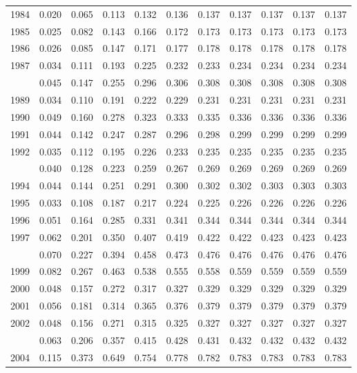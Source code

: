 \documentclass[
]{article}
\begin{document}
\begin{longtable}[t]{lrrrrrrrrrr}
1984 & 0.020 & 0.065 & 0.113 & 0.132 & 0.136 & 0.137 & 0.137 & 0.137 & 0.137 & 0.137\\
1985 & 0.025 & 0.082 & 0.143 & 0.166 & 0.172 & 0.173 & 0.173 & 0.173 & 0.173 & 0.173\\
1986 & 0.026 & 0.085 & 0.147 & 0.171 & 0.177 & 0.178 & 0.178 & 0.178 & 0.178 & 0.178\\
1987 & 0.034 & 0.111 & 0.193 & 0.225 & 0.232 & 0.233 & 0.234 & 0.234 & 0.234 & 0.234\\
\addlinespace
1988 & 0.045 & 0.147 & 0.255 & 0.296 & 0.306 & 0.308 & 0.308 & 0.308 & 0.308 & 0.308\\
1989 & 0.034 & 0.110 & 0.191 & 0.222 & 0.229 & 0.231 & 0.231 & 0.231 & 0.231 & 0.231\\
1990 & 0.049 & 0.160 & 0.278 & 0.323 & 0.333 & 0.335 & 0.336 & 0.336 & 0.336 & 0.336\\
1991 & 0.044 & 0.142 & 0.247 & 0.287 & 0.296 & 0.298 & 0.299 & 0.299 & 0.299 & 0.299\\
1992 & 0.035 & 0.112 & 0.195 & 0.226 & 0.233 & 0.235 & 0.235 & 0.235 & 0.235 & 0.235\\
\addlinespace
1993 & 0.040 & 0.128 & 0.223 & 0.259 & 0.267 & 0.269 & 0.269 & 0.269 & 0.269 & 0.269\\
1994 & 0.044 & 0.144 & 0.251 & 0.291 & 0.300 & 0.302 & 0.302 & 0.303 & 0.303 & 0.303\\
1995 & 0.033 & 0.108 & 0.187 & 0.217 & 0.224 & 0.225 & 0.226 & 0.226 & 0.226 & 0.226\\
1996 & 0.051 & 0.164 & 0.285 & 0.331 & 0.341 & 0.344 & 0.344 & 0.344 & 0.344 & 0.344\\
1997 & 0.062 & 0.201 & 0.350 & 0.407 & 0.419 & 0.422 & 0.422 & 0.423 & 0.423 & 0.423\\
\addlinespace
1998 & 0.070 & 0.227 & 0.394 & 0.458 & 0.473 & 0.476 & 0.476 & 0.476 & 0.476 & 0.476\\
1999 & 0.082 & 0.267 & 0.463 & 0.538 & 0.555 & 0.558 & 0.559 & 0.559 & 0.559 & 0.559\\
2000 & 0.048 & 0.157 & 0.272 & 0.317 & 0.327 & 0.329 & 0.329 & 0.329 & 0.329 & 0.329\\
2001 & 0.056 & 0.181 & 0.314 & 0.365 & 0.376 & 0.379 & 0.379 & 0.379 & 0.379 & 0.379\\
2002 & 0.048 & 0.156 & 0.271 & 0.315 & 0.325 & 0.327 & 0.327 & 0.327 & 0.327 & 0.327\\
\addlinespace
2003 & 0.063 & 0.206 & 0.357 & 0.415 & 0.428 & 0.431 & 0.432 & 0.432 & 0.432 & 0.432\\
2004 & 0.115 & 0.373 & 0.649 & 0.754 & 0.778 & 0.782 & 0.783 & 0.783 & 0.783 & 0.783\\

\end{longtable}
\end{document}
